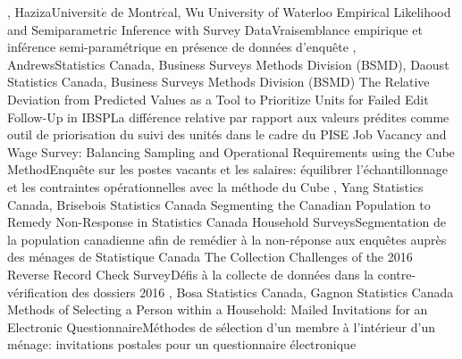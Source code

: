 
{
,  {Haziza}{Universit$\acute{e}$ de Montr$\acute{e}$al},  {Wu}
{University of Waterloo}
}
{Empirical Likelihood and Semiparametric Inference with Survey Data}{Vraisemblance empirique et inférence semi-paramétrique en présence de données d’enquête}
{\bubbleE \enspace \screenE}
{
,  {Andrews}{Statistics Canada, Business Surveys Methods Division (BSMD)},  {Daoust}
{Statistics Canada, Business Surveys Methods Division (BSMD)}
}
{The Relative Deviation from Predicted Values as a Tool to Prioritize Units for Failed Edit Follow-Up in IBSP}{La différence relative par rapport aux valeurs prédites comme outil de priorisation du suivi des unités dans le cadre du PISE}
{\bubbleE \enspace \screenE}
{
}
{Job Vacancy and Wage Survey: Balancing Sampling and Operational Requirements using the Cube Method}{Enquête sur les postes vacants et les salaires: équilibrer l’échantillonnage et les contraintes opérationnelles avec la méthode du Cube}
{\bubbleE \enspace \screenE}
{
,  {Yang}
{Statistics Canada},  {Brisebois}
{Statistics Canada}
}
{Segmenting the Canadian Population to Remedy Non-Response in Statistics Canada Household Surveys}{Segmentation de la population canadienne afin de remédier à la non-réponse aux enquêtes auprès des ménages de Statistique Canada}
{\bubbleE \enspace \screenE}
{
}
{The Collection Challenges of the 2016 Reverse Record Check Survey}{Défis à la collecte de données dans la contre-vérification des dossiers 2016}
{\bubbleE \enspace \screenE}
{
,  {Bosa}
{Statistics Canada},  {Gagnon}
{Statistics Canada}
}
{Methods of Selecting a Person within a Household: Mailed Invitations for an Electronic Questionnaire}{Méthodes de sélection d’un membre à l’intérieur d’un ménage: invitations postales pour un questionnaire électronique}
{\bubbleE \enspace \screenE}



